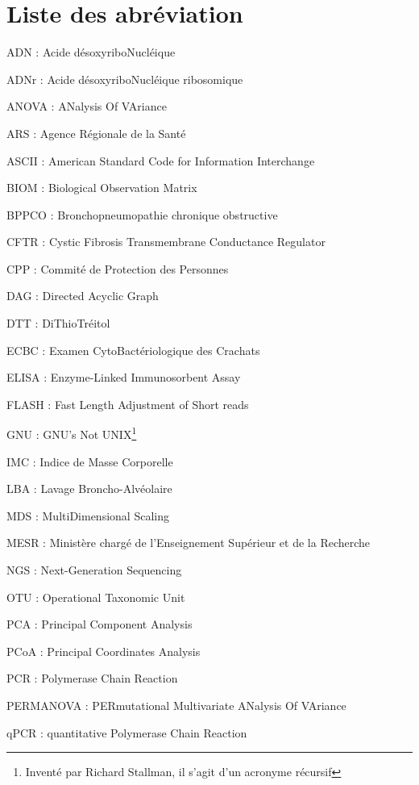 \documentclass[12pt,a4paper]{article}
\begin{document}
\newpage
\tableofcontents
\newpage
\listoffigures
\newpage
\listoftables
\newpage
\section*{Liste des abréviation}

\begin{description}[leftmargin=*]
\item ADN : Acide désoxyriboNucléique
\item ADNr : Acide désoxyriboNucléique ribosomique
\item ANOVA : ANalysis Of VAriance
\item ARS : Agence Régionale de la Santé
\item ASCII : American Standard Code for Information Interchange
\item BIOM :  Biological Observation Matrix
\item BPPCO : Bronchopneumopathie chronique obstructive
\item CFTR : Cystic Fibrosis Transmembrane Conductance Regulator
\item CPP : Commité de Protection des Personnes
\item DAG : Directed Acyclic Graph
\item DTT : DiThioTréitol
\item ECBC : Examen CytoBactériologique des Crachats
\item ELISA : Enzyme-Linked Immunosorbent Assay
\item FLASH : Fast Length Adjustment of Short reads
\item GNU : GNU’s Not UNIX\footnote{Inventé par Richard Stallman, il s'agit d'un acronyme récursif}
\item IMC : Indice de Masse Corporelle
\item LBA :  Lavage Broncho-Alvéolaire
\item MDS : MultiDimensional Scaling
\item MESR : Ministère chargé de l'Enseignement Supérieur et de la Recherche
\item NGS : Next-Generation Sequencing
\item OTU : Operational Taxonomic Unit
\item PCA : Principal Component Analysis
\item PCoA : Principal Coordinates Analysis
\item PCR : Polymerase Chain Reaction
\item PERMANOVA : PERmutational Multivariate ANalysis Of VAriance
\item qPCR : quantitative Polymerase Chain Reaction

\end{description}
\end{document}
